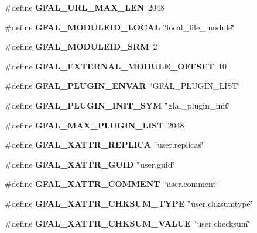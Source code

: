 \begin{CompactItemize}
\item 
\#define \textbf{GFAL\_\-URL\_\-MAX\_\-LEN}~2048\label{gfal__constants_8h_8aeca034bb7345f07b3b736501168cdd}

\item 
\#define \textbf{GFAL\_\-MODULEID\_\-LOCAL}~\char`\"{}local\_\-file\_\-module\char`\"{}\label{gfal__constants_8h_6843a99bf27c1e7f0ea245ba0a4b4638}

\item 
\#define \textbf{GFAL\_\-MODULEID\_\-SRM}~2\label{gfal__constants_8h_81086ad079cc0d38b02e33018b11cb78}

\item 
\#define \textbf{GFAL\_\-EXTERNAL\_\-MODULE\_\-OFFSET}~10\label{gfal__constants_8h_c3acf68b834fb0400f412735badbe8bb}

\item 
\#define \textbf{GFAL\_\-PLUGIN\_\-ENVAR}~\char`\"{}GFAL\_\-PLUGIN\_\-LIST\char`\"{}\label{gfal__constants_8h_c414ec8b2ed505d8318b1102ea3dd987}

\item 
\#define \textbf{GFAL\_\-PLUGIN\_\-INIT\_\-SYM}~\char`\"{}gfal\_\-plugin\_\-init\char`\"{}\label{gfal__constants_8h_6549284d505729b12a761cbb6c3914f5}

\item 
\#define \textbf{GFAL\_\-MAX\_\-PLUGIN\_\-LIST}~2048\label{gfal__constants_8h_8b50ed92a1ea58484de650f667db28f1}

\item 
\#define \textbf{GFAL\_\-XATTR\_\-REPLICA}~\char`\"{}user.replicas\char`\"{}\label{gfal__constants_8h_99cf748c03f297ef6e429cbd2dfe3c35}

\item 
\#define \textbf{GFAL\_\-XATTR\_\-GUID}~\char`\"{}user.guid\char`\"{}\label{gfal__constants_8h_a395dff27be0cd2e43081098f5c68833}

\item 
\#define \textbf{GFAL\_\-XATTR\_\-COMMENT}~\char`\"{}user.comment\char`\"{}\label{gfal__constants_8h_43f447aa0c1b5fe95a4c79b23c770952}

\item 
\#define \textbf{GFAL\_\-XATTR\_\-CHKSUM\_\-TYPE}~\char`\"{}user.chksumtype\char`\"{}\label{gfal__constants_8h_fc6ffd43ad73ab219155b61c02405aec}

\item 
\#define \textbf{GFAL\_\-XATTR\_\-CHKSUM\_\-VALUE}~\char`\"{}user.checksum\char`\"{}\label{gfal__constants_8h_2e084155870841ad60f7353089f3bdf4}


\end{CompactItemize}
